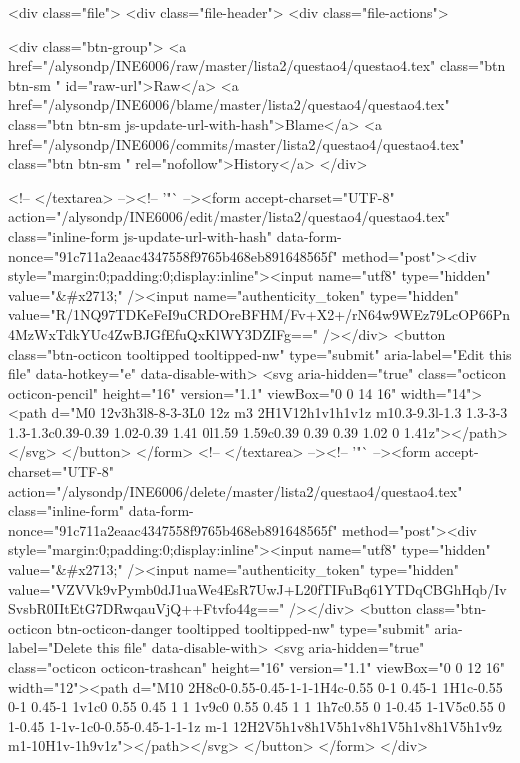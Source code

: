<div class="file">
  <div class="file-header">
  <div class="file-actions">

    <div class="btn-group">
      <a href="/alysondp/INE6006/raw/master/lista2/questao4/questao4.tex" class="btn btn-sm " id="raw-url">Raw</a>
        <a href="/alysondp/INE6006/blame/master/lista2/questao4/questao4.tex" class="btn btn-sm js-update-url-with-hash">Blame</a>
      <a href="/alysondp/INE6006/commits/master/lista2/questao4/questao4.tex" class="btn btn-sm " rel="nofollow">History</a>
    </div>


        <!-- </textarea> --><!-- '"` --><form accept-charset="UTF-8" action="/alysondp/INE6006/edit/master/lista2/questao4/questao4.tex" class="inline-form js-update-url-with-hash" data-form-nonce="91c711a2eaac4347558f9765b468eb891648565f" method="post"><div style="margin:0;padding:0;display:inline"><input name="utf8" type="hidden" value="&#x2713;" /><input name="authenticity_token" type="hidden" value="R/1NQ97TDKeFeI9uCRDOreBFHM/Fv+X2+/rN64w9WEz79LcOP66Pn4MzWxTdkYUc4ZwBJGfEfuQxKlWY3DZIFg==" /></div>
          <button class="btn-octicon tooltipped tooltipped-nw" type="submit"
            aria-label="Edit this file" data-hotkey="e" data-disable-with>
            <svg aria-hidden="true" class="octicon octicon-pencil" height="16" version="1.1" viewBox="0 0 14 16" width="14"><path d="M0 12v3h3l8-8-3-3L0 12z m3 2H1V12h1v1h1v1z m10.3-9.3l-1.3 1.3-3-3 1.3-1.3c0.39-0.39 1.02-0.39 1.41 0l1.59 1.59c0.39 0.39 0.39 1.02 0 1.41z"></path></svg>
          </button>
</form>        <!-- </textarea> --><!-- '"` --><form accept-charset="UTF-8" action="/alysondp/INE6006/delete/master/lista2/questao4/questao4.tex" class="inline-form" data-form-nonce="91c711a2eaac4347558f9765b468eb891648565f" method="post"><div style="margin:0;padding:0;display:inline"><input name="utf8" type="hidden" value="&#x2713;" /><input name="authenticity_token" type="hidden" value="VZVVk9vPymb0dJ1uaWe4EsR7UwJ+L20fTIFuBq61YTDqCBGhHqb/IvSvsbR0IItEtG7DRwqauVjQ++Ftvfo44g==" /></div>
          <button class="btn-octicon btn-octicon-danger tooltipped tooltipped-nw" type="submit"
            aria-label="Delete this file" data-disable-with>
            <svg aria-hidden="true" class="octicon octicon-trashcan" height="16" version="1.1" viewBox="0 0 12 16" width="12"><path d="M10 2H8c0-0.55-0.45-1-1-1H4c-0.55 0-1 0.45-1 1H1c-0.55 0-1 0.45-1 1v1c0 0.55 0.45 1 1 1v9c0 0.55 0.45 1 1 1h7c0.55 0 1-0.45 1-1V5c0.55 0 1-0.45 1-1v-1c0-0.55-0.45-1-1-1z m-1 12H2V5h1v8h1V5h1v8h1V5h1v8h1V5h1v9z m1-10H1v-1h9v1z"></path></svg>
          </button>
</form>  </div>

